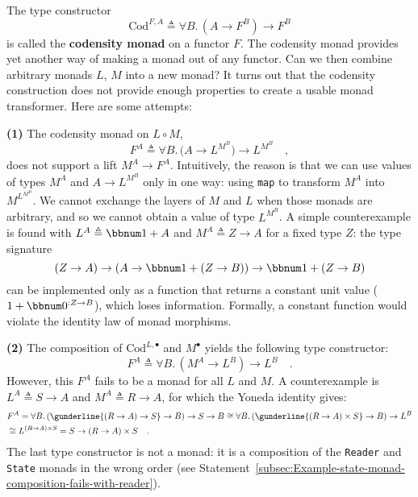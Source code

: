 The type constructor 
\[
\text{Cod}^{F,A}\triangleq\forall B.\,(A\rightarrow F^{B})\rightarrow F^{B}
\]
is called the \textbf{codensity monad} on
a functor $F$. The codensity monad provides yet another way of making
a monad out of any functor. Can we then combine arbitrary monads $L$,
$M$ into a new monad? It turns out that the codensity construction
does not provide enough properties to create a usable monad transformer.
Here are some attempts:

\textbf{(1)} The codensity monad on $L\circ M$,
\[
F^{A}\triangleq\forall B.\,\big(A\rightarrow L^{M^{B}}\big)\rightarrow L^{M^{B}}\quad,
\]
does not support a lift $M^{A}\rightarrow F^{A}$. Intuitively, the
reason is that we can use values of types $M^{A}$ and $A\rightarrow L^{M^{B}}$
only in one way: using \lstinline!map! to transform $M^{A}$ into
$M^{L^{M^{B}}}$. We cannot exchange the layers of $M$ and $L$ when
those monads are arbitrary, and so we cannot obtain a value of type
$L^{M^{B}}$. A simple counterexample is found with $L^{A}\triangleq\bbnum 1+A$
and $M^{A}\triangleq Z\rightarrow A$ for a fixed type $Z$: the type
signature
\[
(Z\rightarrow A)\rightarrow(A\rightarrow\bbnum 1+(Z\rightarrow B))\rightarrow\bbnum 1+(Z\rightarrow B)
\]
can be implemented only as a function that returns a constant unit
value ($1+\bbnum 0^{:Z\rightarrow B}$), which loses information.
Formally, a constant function would violate the identity law of monad
morphisms.

\textbf{(2)} The composition of $\text{Cod}^{L,\bullet}$ and $M^{\bullet}$
yields the following type constructor:
\[
F^{A}\triangleq\forall B.\,(M^{A}\rightarrow L^{B})\rightarrow L^{B}\quad.
\]
However, this $F^{A}$ fails to be a monad for all $L$ and $M$.
A counterexample is $L^{A}\triangleq S\rightarrow A$ and $M^{A}\triangleq R\rightarrow A$,
for which the Yoneda identity gives:
\begin{align*}
 & F^{A}=\forall B.\,(\gunderline{(R\rightarrow A)\rightarrow S}\rightarrow B)\rightarrow S\rightarrow B\cong\forall B.\,(\gunderline{(R\rightarrow A)\times S}\rightarrow B)\rightarrow L^{B}\\
 & \cong L^{(R\rightarrow A)\times S}=S\rightarrow\left(R\rightarrow A\right)\times S\quad.
\end{align*}
The last type constructor is not a monad: it is a composition of the
\lstinline!Reader! and \lstinline!State! monads in the wrong order
(see Statement~\ref{subsec:Example-state-monad-composition-fails-with-reader}).

